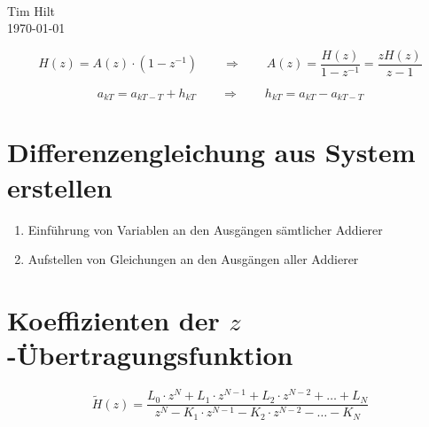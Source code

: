 \documentclass[10pt,a5paper]{scrartcl}
\begin{document}
{\\[1ex]
  Tim Hilt\\
  \today
  \par}

\vfill

\tableofcontents
\clearpage

\[H(z) = A(z) \cdot (1 - z^{-1}) \qquad\Rightarrow\qquad A(z) = \frac{H(z)}{1 - z^{-1}} = \frac{zH(z)}{z-1}\]

\[a_{kT} = a_{kT - T} + h_{kT} \qquad\Rightarrow\qquad h_{kT} = a_{kT} - a_{kT - T}\]

\section{Differenzengleichung aus System erstellen}

\begin{enumerate}
\item Einführung von Variablen an den Ausgängen sämtlicher Addierer
\item Aufstellen von Gleichungen an den Ausgängen aller Addierer
\end{enumerate}

\section{Koeffizienten der $z$-Übertragungsfunktion}

\[\tilde{H}(z) = \frac{L_0 \cdot z^N + L_1 \cdot z^{N-1} + L_2 \cdot z^{N-2} + \ldots+ L_N}{z^N - K_1 \cdot z^{N-1} - K_2\cdot z^{N-2} - \ldots - K_N}\]
\end{document}
